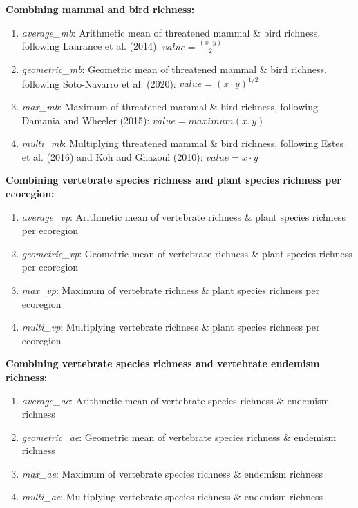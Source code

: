 \documentclass[
]{article}
\providecommand{\tightlist}{%
  \setlength{\itemsep}{0pt}\setlength{\parskip}{0pt}}
\begin{document}
\textbf{Combining mammal and bird richness:}

\begin{enumerate}
\def\labelenumi{(\arabic{enumi})}
\setcounter{enumi}{24}
\tightlist
\item
  \emph{average\_mb}: Arithmetic mean of threatened mammal \& bird richness, following Laurance et al. (2014): \(value = \frac{(x \cdot y)}{2}\)
\item
  \emph{geometric\_mb}: Geometric mean of threatened mammal \& bird richness, following Soto-Navarro et al. (2020): \(value = (x \cdot y)^{1/2}\)
\item
  \emph{max\_mb}: Maximum of threatened mammal \& bird richness, following Damania and Wheeler (2015): \(value = maximum (x,y)\)
\item
  \emph{multi\_mb}: Multiplying threatened mammal \& bird richness, following Estes et al. (2016) and Koh and Ghazoul (2010): \(value = x \cdot y\)
\end{enumerate}

\textbf{Combining vertebrate species richness and plant species richness per ecoregion:}

\begin{enumerate}
\def\labelenumi{(\arabic{enumi})}
\setcounter{enumi}{28}
\tightlist
\item
  \emph{average\_vp}: Arithmetic mean of vertebrate richness \& plant species richness per ecoregion
\item
  \emph{geometric\_vp}: Geometric mean of vertebrate richness \& plant species richness per ecoregion
\item
  \emph{max\_vp}: Maximum of vertebrate richness \& plant species richness per ecoregion
\item
  \emph{multi\_vp}: Multiplying vertebrate richness \& plant species richness per ecoregion
\end{enumerate}

\textbf{Combining vertebrate species richness and vertebrate endemism richness:}

\begin{enumerate}
\def\labelenumi{(\arabic{enumi})}
\setcounter{enumi}{32}
\tightlist
\item
  \emph{average\_ae}: Arithmetic mean of vertebrate species richness \& endemism richness
\item
  \emph{geometric\_ae}: Geometric mean of vertebrate species richness \& endemism richness
\item
  \emph{max\_ae}: Maximum of vertebrate species richness \& endemism richness
\item
  \emph{multi\_ae}: Multiplying vertebrate species richness \& endemism richness
\end{enumerate}
\end{document}
